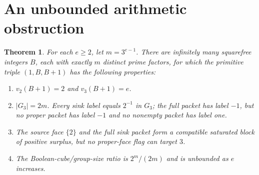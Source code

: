 \documentclass[11pt,a4paper]{article}
\newtheorem{theorem}{Theorem}[section]
\theoremstyle{definition}
\theoremstyle{remark}
\begin{document}
\section{An unbounded arithmetic obstruction}
\begin{theorem}\label{thm:main}
For each $e\ge2$, let $m=3^{e-1}$. There are infinitely many squarefree
integers $B$, each with exactly $m$ distinct prime factors, for which the
primitive triple $(1,B,B+1)$ has the following properties:
\begin{enumerate}
\item $v_2(B+1)=2$ and $v_3(B+1)=e$.
\item $|G_3|=2m$. Every sink label equals $2^{-1}$ in $G_3$; the full
packet has label $-1$, but no proper packet has label $-1$ and no nonempty
packet has label one.
\item The source face $\{2\}$ and the full sink packet form a compatible
saturated block of positive surplus, but no proper-face flag can target $3$.
\item The Boolean-cube/group-size ratio is $2^m/(2m)$ and is unbounded as
$e$ increases.
\end{enumerate}
\end{theorem}
\end{document}
